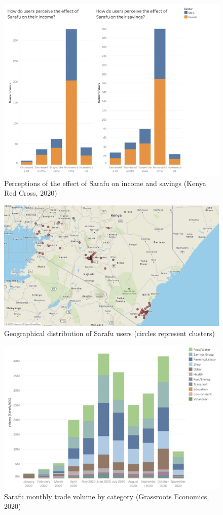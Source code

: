 \documentclass[12pt]{article}
\begin{document}
\begin{figure}[hp]
    \centering
    \includegraphics[width=.9\textwidth]{figures/fig_2}
    \caption{Perceptions of the effect of Sarafu on income and savings (Kenya Red Cross, 2020)}
    \label{fig:fig2}
\end{figure}

\begin{figure}[hp]
    \centering
    \includegraphics[width=\textwidth]{figures/fig_3}
    \caption{Geographical distribution of Sarafu users (circles represent clusters)}
    \label{fig:fig3}
\end{figure}

\begin{figure}[hp]
    \centering
    \includegraphics[width=.9\textwidth]{figures/fig_4}
    \caption{Sarafu monthly trade volume by category (Grassroots Economics, 2020)}
    \label{fig:fig4}
\end{figure}
\end{document}
